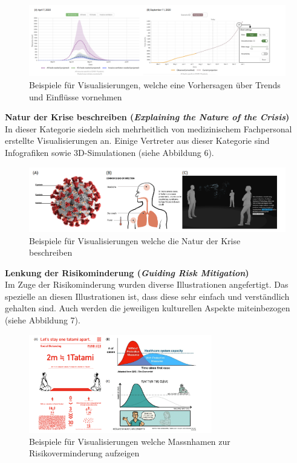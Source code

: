 \documentclass[12pt, oneside]{article}
\begin{document}
\begin{figure}[ht]
	\includegraphics[width=12cm]{images/forecasting_visualizations.png}
	\centering
	\caption{Beispiele für Visualisierungen, welche eine Vorhersagen über Trends und Einflüsse vornehmen ~\citep[S. 11]{YixuanZhang.}}
\end{figure}

\textbf{Natur der Krise beschreiben (\textit{Explaining the Nature of the Crisis})}\\
In dieser Kategorie siedeln sich mehrheitlich von medizinischem Fachpersonal erstellte Visualisierungen an. Einige Vertreter aus dieser Kategorie sind Infografiken sowie 3D-Simulationen (siehe Abbildung 6).

\begin{figure}[ht]
	\includegraphics[width=12cm]{images/nature_of_crisis_visualizations.png}
	\centering
	\caption{Beispiele für Visualisierungen welche die Natur der Krise beschreiben ~\citep[S. 11]{YixuanZhang.}}
\end{figure}

\textbf{Lenkung der Risikominderung (\textit{Guiding Risk Mitigation})}\\
Im Zuge der Risikominderung wurden diverse Illustrationen angefertigt. Das spezielle an diesen Illustrationen ist, dass diese sehr einfach und verständlich gehalten sind. Auch werden die jeweiligen kulturellen Aspekte miteinbezogen (siehe Abbildung 7).


\begin{figure}[ht]
	\includegraphics[width=8cm]{images/risk_mitigation_visualizations.png}
	\centering
	\caption{Beispiele für Visualisierungen welche Massnhamen zur Risikoverminderung aufzeigen ~\citep[S. 12]{YixuanZhang.}}
\end{figure}
\end{document}
